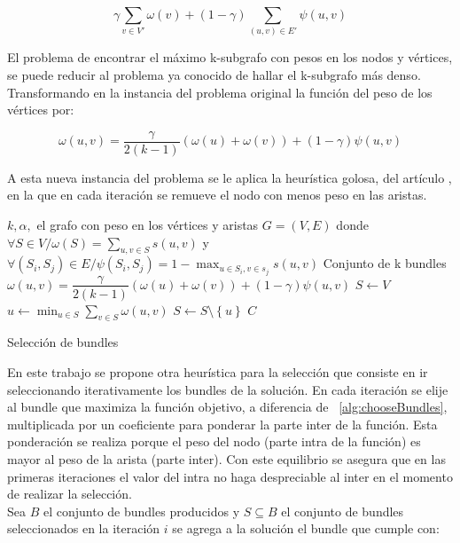 \begin{equation}
\gamma \sum_{v \in V'}{\omega(v)} + (1 - \gamma) \sum_{(u,v) \in E'}{\psi(u,v)}
\end{equation}

El problema de encontrar el máximo k-subgrafo con pesos en los nodos y vértices, se puede reducir al problema ya conocido de hallar el k-subgrafo más denso\cite{SubgraphProblem}. Transformando en la instancia del problema original la función del peso de los vértices por:
 
\begin{equation}
\omega(u,v) = \dfrac{\gamma}{2( k - 1)} (\omega(u) + \omega(v)) + (1 - \gamma)\psi(u,v) 
\end{equation}

A esta nueva instancia del problema se le aplica la heurística golosa, del artículo \cite{compositeRetrival}, en la que en cada iteración se remueve el nodo con menos peso en las aristas.\\

\begin{algorithm}[H]
\begin{algorithmic}[1]
\REQUIRE $k,\alpha,$ el grafo con peso en los vértices y aristas  $G=(V,E)$ donde $\forall S \in V / \omega(S) = \sum_{u,v \in S}{s(u,v)}$ y $\forall (S_i,S_j) \in E / \psi(S_i,S_j) = 1 - \max_{u \in S_i, v \in s_j}{s(u,v)}$
\ENSURE Conjunto de k bundles
\STATE $\omega(u,v) = \dfrac{\gamma}{2( k - 1)} (\omega(u) + \omega(v)) + (1 - \gamma)\psi(u,v)$
\STATE $S \leftarrow V$
\STATE $u \leftarrow \min_{u \in S}{\sum_{v \in S}{\omega(u,v)}}$
\STATE $S \leftarrow S \setminus  \left\{u\right\} $
\ENDWHILE
\RETURN $C$
\end{algorithmic}
\caption{Selección de bundles}\label{alg:chooseBundles}
\end{algorithm}

En este trabajo se propone otra heurística para la selección que consiste en ir seleccionando iterativamente los bundles de la solución. En cada iteración se elije al bundle que maximiza la función objetivo, a diferencia de ~\ref{alg:chooseBundles}, multiplicada por un coeficiente para ponderar la parte inter de la función. Esta ponderación se realiza porque el peso del nodo (parte intra de la función) es mayor al peso de la arista (parte inter). Con este equilibrio se asegura que en las primeras iteraciones el valor del intra no haga despreciable al inter en el momento de realizar la selección.\\
Sea $B$ el conjunto de bundles producidos y $S \subseteq B$ el conjunto de bundles seleccionados en la iteración $i$ se agrega a la solución el bundle que cumple con:

